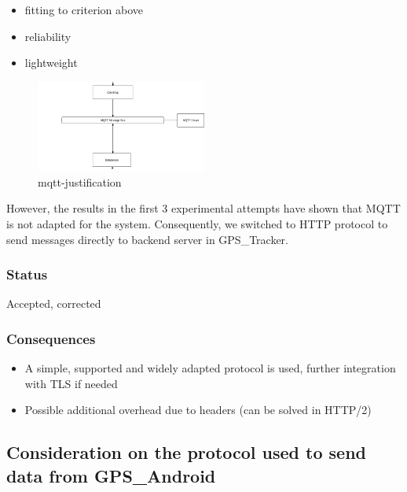 \begin{itemize}
\tightlist
\item
  fitting to criterion above
\item
  reliability
\item
  lightweight
\end{itemize}

\begin{figure}
\centering
\includegraphics[width=0.5\textwidth,height=\textheight]{mqtt-justification.png}
\caption{mqtt-justification}
\end{figure}

However, the results in the first 3 experimental attempts have shown
that MQTT is not adapted for the system. Consequently, we switched to
HTTP protocol to send messages directly to backend server in
GPS\_Tracker.

\hypertarget{status}{%
\subsubsection{Status}\label{status}}

Accepted, corrected

\hypertarget{consequences}{%
\subsubsection{Consequences}\label{consequences}}

\begin{itemize}
\tightlist
\item
  A simple, supported and widely adapted protocol is used, further
  integration with TLS if needed
\item
  Possible additional overhead due to headers (can be solved in HTTP/2)
\end{itemize}

\hypertarget{consideration-on-the-protocol-used-to-send-data-from-gps_android-1}{%
\subsection{Consideration on the protocol used to send data from
GPS\_Android}\label{consideration-on-the-protocol-used-to-send-data-from-gps_android-1}}

